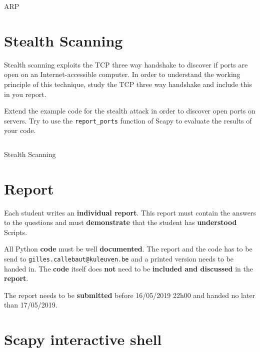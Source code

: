 \documentclass[11pt,a4paper]{article}
\begin{document}
\begin{listing}[h]
    \inputminted{python}{../code_students/example-arp.py}
\caption{ARP}\label{listing:arp-request}
\end{listing}

\FloatBarrier
\section{Stealth Scanning}
Stealth scanning exploits the TCP three way handshake to discover if ports are open on an Internet-accessible computer. In order to understand the working principle of this technique, study the TCP three way handshake and include this in you report.

\begin{question}
Extend the example code for the stealth attack in order to discover open ports on servers.
Try to use the \texttt{report\_ports} function of Scapy to evaluate the results of your code.
\end{question}


\begin{listing}[h]
\inputminted{python}{../code_students/stealth_scanning.py}
\caption{Stealth Scanning}%
\label{listing:stealth-scanning}
\end{listing}


\FloatBarrier
\section{Report}
Each student writes an \textbf{individual report}. 
This report must contain the answers to the questions and must \textbf{demonstrate} that the student has \textbf{understood} Scripts. 

All Python \textbf{code} must be well \textbf{documented}.
The report and the code has to be send to \texttt{gilles.callebaut@kuleuven.be} and a printed version needs to be handed in. The \textbf{code} itself does \textbf{not} need to be \textbf{included and discussed} in the \textbf{report}.


The report needs to be \textbf{submitted} before 16/05/2019 22h00 and handed no later than 17/05/2019.






\clearpage
\appendix
\section{Scapy interactive shell}\label{sec:scapy-interactive}
\end{document}
